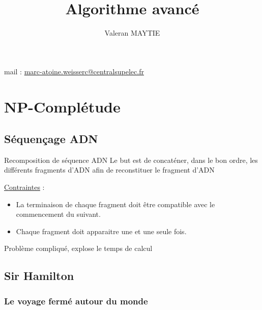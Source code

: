 \documentclass{article}
\title{Algorithme avancé}
\author{Valeran MAYTIE}
\date{}
\theoremstyle{plain}
\begin{document}
  \maketitle{}

  mail : \href{mailto:marc-atoine.weisserc@centralsupelec.fr}
              {marc-atoine.weisserc@centralsupelec.fr}

  \tableofcontents{}

  \section{NP-Complétude}

    \subsection{Séquençage ADN}
    
      Recomposition de séquence ADN
      Le but est de concaténer, dans le bon ordre, les différents fragments
      d'ADN afin de reconstituer le fragment d'ADN

      \underline{Contraintes} :
      \begin{itemize}
        \item La terminaison de chaque fragment doit être compatible
              avec le commencement du suivant.

        \item Chaque fragment doit apparaitre une et une seule fois.
      \end{itemize}

      Problème compliqué, explose le temps de calcul

    \subsection{Sir Hamilton}

      \subsubsection{Le voyage fermé autour du monde} \vspace{5mm}
  
\end{document}
